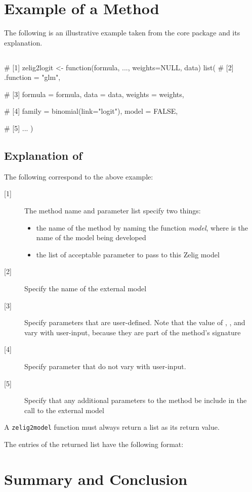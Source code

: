 \section{Example of a  Method}

The following is an illustrative example taken from the  core package and its explanation.


\subsection{}

\begin{Code}
# [1]
zelig2logit <- function(formula, ..., weights=NULL, data)
  list(
       # [2]
       .function = "glm",
        
       # [3]
       formula = formula,
       data    = data,
       weights = weights,
       
       # [4]
       family = binomial(link="logit"),
       model  = FALSE,
       
       # [5]
       ...
       )
\end{Code}


\subsection{Explanation of }

The following correspond to the above example:

\begin{description}
	\item[{[1]}] The method name and parameter list specify two things:
	\begin{itemize}
		\item the name of the  method by naming the function \emph{model}, where  is the name of the model being developed
		\item the list of acceptable parameter to pass to this Zelig model
	\end{itemize}
	\item[{[2]}] Specify the name of the external model
	\item[{[3]}] Specify parameters that are user-defined. Note that the value of , , and  vary with user-input, because they are part of the  method's signature
	\item[{[4]}] Specify parameter that do not vary with user-input.
	\item[{[5]}] Specify that any additional parameters to the  method be include in the call to the external model
\end{description}

A {\tt zelig2model} function must always return a list as its return value.

The entries of the returned list have the following format:



\section{Summary and Conclusion}